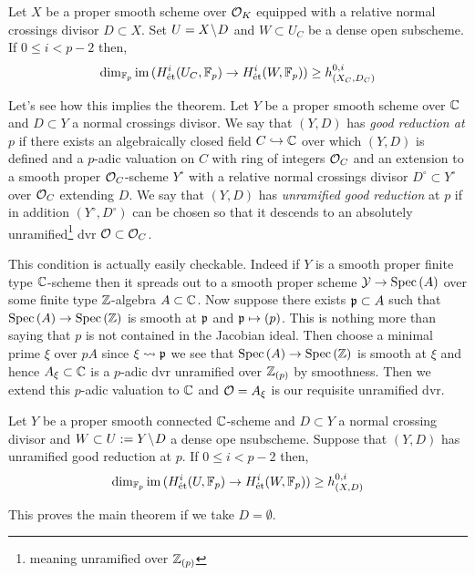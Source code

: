 \documentclass[12pt]{article}
\begin{document}
\begin{prop} \label{main_prop}
Let $X$ be a proper smooth scheme over $\mathcal{O}_K$ equipped with a relative normal crossings divisor $D \subset X$. Set $U = X \! \setminus \! D$ and $W \subset U_C$ be a dense open subscheme. If $0 \le i < p -2$ then,
\[ \dim_{\mathbb{F}_p} \operatorname{\mathrm{im}}{(H^i_{\text{\'{e}t}}(U_C, \mathbb{F}_p) \to H^i_{\text{\'{e}t}}(W, \mathbb{F}_p))} \ge h^{0,i}_{(X_C, D_C)} \]
\end{prop}
\bigskip
Let's see how this implies the theorem. Let $Y$ be a proper smooth scheme over $\mathbb{C}$ and $D \subset Y$ a normal crossings divisor. We say that $(Y, D)$ has \textit{good reduction at} $p$ if there exists an algebraically closed field $C \hookrightarrow \mathbb{C}$ over which $(Y, D)$ is defined and a $p$-adic valuation on $C$ with ring of integers $\mathcal{O}_C$ and an extension to a smooth proper $\mathcal{O}_C$-scheme $Y^\circ$ with a relative normal crossings divisor $D^\circ \subset Y^\circ$ over $\mathcal{O}_C$ extending $D$. We say that $(Y, D)$ has \textit{unramified good reduction} at $p$ if in addition $(Y^\circ, D^\circ)$ can be chosen so that it descends to an absolutely unramified\footnote{meaning unramified over $\mathbb{Z}_{(p)}$} dvr $\mathcal{O} \subset \mathcal{O}_C$. 

\begin{rmk}
This condition is actually easily checkable. Indeed if $Y$ is a smooth proper finite type $\mathbb{C}$-scheme then it spreads out to a smooth proper scheme $\mathcal{Y} \to \mathrm{Spec}\left( A \right)$ over some finite type $\mathbb{Z}$-algebra $A \subset \mathbb{C}$. Now suppose there exists $\mathfrak{p} \subset A$ such that $\mathrm{Spec}\left( A \right) \to \mathrm{Spec}\left( \mathbb{Z} \right)$ is smooth at $\mathfrak{p}$ and $\mathfrak{p} \mapsto (p)$. This is nothing more than saying that $p$ is not contained in the Jacobian ideal. Then choose a minimal prime $\xi$ over $p A$ since $\xi \rightsquigarrow \mathfrak{p}$ we see that $\mathrm{Spec}\left( A \right) \to \mathrm{Spec}\left( \mathbb{Z} \right)$ is smooth at $\xi$ and hence $A_{\xi} \subset \mathbb{C}$ is a $p$-adic dvr unramified over $\mathbb{Z}_{(p)}$ by smoothness. Then we extend this $p$-adic valuation to $\mathbb{C}$ and $\mathcal{O} = A_{\xi}$ is our requisite unramified dvr. 
\end{rmk}

\begin{cor}
Let $Y$ be a proper smooth connected $\mathbb{C}$-scheme and $D \subset Y$ a normal crossing divisor and $W \subset U := Y \! \setminus \! D$ a dense ope nsubscheme. Suppose that $(Y, D)$ has unramified good reduction at $p$. If $0 \le i < p - 2$ then,
\[ \dim_{\mathbb{F}_p} \operatorname{\mathrm{im}}{(H^i_{\text{\'{e}t}}(U, \mathbb{F}_p) \to H^i_{\text{\'{e}t}}(W, \mathbb{F}_p))} \ge h^{0,i}_{(X, D)} \]
\end{cor}

This proves the main theorem if we take $D = \emptyset$.
\end{document}
